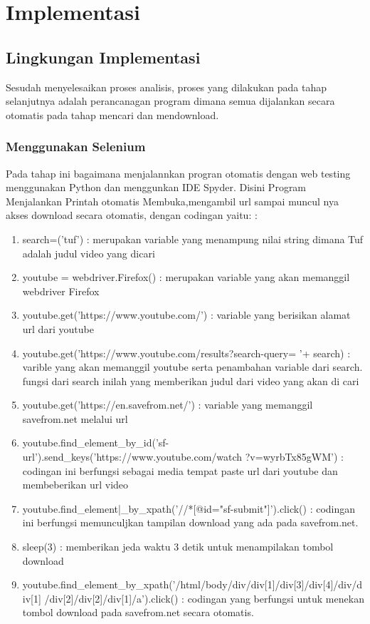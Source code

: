 \chapter{Implementasi}
\section{Lingkungan Implementasi}
Sesudah menyelesaikan proses analisis, proses yang dilakukan pada tahap selanjutnya adalah perancanagan program dimana semua dijalankan secara otomatis pada tahap mencari dan mendownload.


\subsection{Menggunakan Selenium}
    Pada tahap ini bagaimana menjalannkan progran otomatis dengan web testing menggunakan Python dan menggunkan IDE Spyder. Disini Program Menjalankan Printah otomatis Membuka,mengambil url sampai muncul nya akses download secara otomatis, dengan codingan yaitu: :

\begin{enumerate}
    \item search=('tuf') :
    merupakan variable yang menampung nilai string dimana Tuf adalah judul video yang dicari
    \item youtube = webdriver.Firefox() :
    merupakan variable yang akan memanggil webdriver Firefox
    \item youtube.get('https://www.youtube.com/') :
    variable yang berisikan alamat url dari youtube 
    \item youtube.get('https://www.youtube.com/results?search-query= '+ search) :
    varible yang akan memanggil youtube serta penambahan variable dari search. fungsi dari search inilah yang memberikan judul dari video yang akan di cari
    \item youtube.get('https://en.savefrom.net/') :
    variable yang memanggil savefrom.net melalui url
    \item youtube.find\_element\_by\_id('sf-url').send\_keys('https://www.youtube.com/watch
    ?v=wyrbTx85gWM') :
    codingan ini berfungsi sebagai media tempat paste url dari youtube dan membeberikan url video
    \item youtube.find\_element|\_by\_xpath('//*[@id="sf-submit"]').click() :
    codingan ini berfungsi memunculjkan tampilan download yang ada pada savefrom.net.
    \item sleep(3) : memberikan jeda waktu 3 detik untuk menampilakan tombol download 
    \item youtube.find\_element\_by\_xpath('/html/body/div/div[1]/div[3]/div[4]/div/div[1]
    /div[2]/div[2]/div[1]/a').click() : codingan yang berfungsi  untuk menekan tombol download pada savefrom.net secara otomatis.
\end{enumerate}

